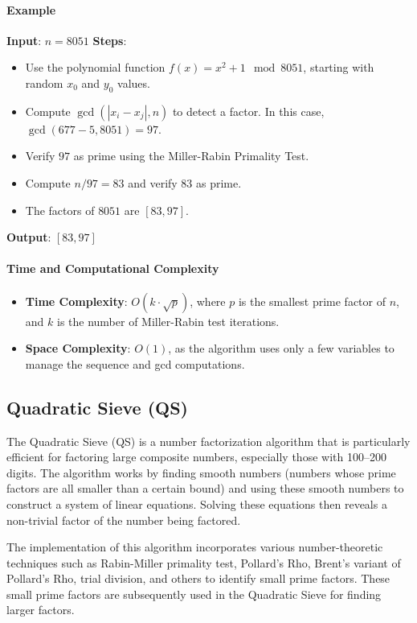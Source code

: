 \documentclass[12pt]{report}
\begin{document}
\paragraph{Example}

\textbf{Input}: $n = 8051$  
\textbf{Steps}:
\begin{itemize}
    \item Use the polynomial function $f(x) = x^2 + 1 \mod 8051$, starting with random $x_0$ and $y_0$ values.
    \item Compute $\gcd(|x_i - x_j|, n)$ to detect a factor. In this case, $\gcd(677 - 5, 8051) = 97$.
    \item Verify $97$ as prime using the Miller-Rabin Primality Test.
    \item Compute $n / 97 = 83$ and verify $83$ as prime.
    \item The factors of $8051$ are $[83, 97]$.
\end{itemize}

\textbf{Output}: $[83, 97]$

\paragraph{Time and Computational Complexity}
\begin{itemize}
    \item \textbf{Time Complexity}: $O(k \cdot \sqrt{p})$, where $p$ is the smallest prime factor of $n$, and $k$ is the number of Miller-Rabin test iterations.
    \item \textbf{Space Complexity}: $O(1)$, as the algorithm uses only a few variables to manage the sequence and gcd computations.
\end{itemize}


\subsection{Quadratic Sieve (QS)}

The Quadratic Sieve (QS) is a number factorization algorithm that is particularly efficient for factoring large composite numbers, especially those with 100–200 digits. The algorithm works by finding smooth numbers (numbers whose prime factors are all smaller than a certain bound) and using these smooth numbers to construct a system of linear equations. Solving these equations then reveals a non-trivial factor of the number being factored.

The implementation of this algorithm incorporates various number-theoretic techniques such as Rabin-Miller primality test, Pollard’s Rho, Brent’s variant of Pollard’s Rho, trial division, and others to identify small prime factors. These small prime factors are subsequently used in the Quadratic Sieve for finding larger factors.
\end{document}
